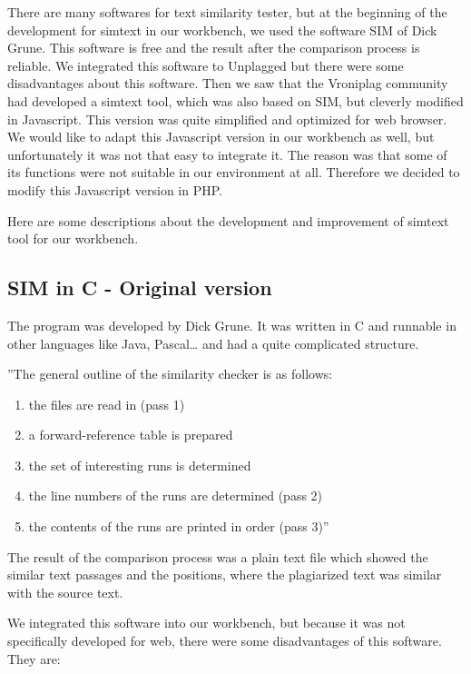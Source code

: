 There are many softwares for text similarity tester, but at the beginning of the development for simtext in our workbench, we used the software SIM of Dick Grune. This software is free and the result after the comparison process is reliable. We integrated this software to Unplagged but there were some disadvantages about this software. Then we saw that the Vroniplag community had developed a simtext tool, which was also based on SIM, but cleverly modified in Javascript. This version was quite simplified and optimized for web browser. We would like to adapt this Javascript version in our workbench as well, but unfortunately it was not that easy to integrate it. The reason was that some of its functions were not suitable in our environment at all. Therefore we decided to modify this Javascript version in PHP. 

Here are some descriptions about the development and improvement of simtext tool for our workbench.

\subsection{SIM in C - Original version}
The program was developed by Dick Grune. It was written in C and runnable in other languages like Java, Pascal… and had a quite complicated structure. 

''The general outline of the similarity checker is as follows:


\begin{enumerate}
\item the files are read in (pass 1)
\item a forward-reference table is prepared
\item the set of interesting runs is determined
\item the line numbers of the runs are determined (pass 2)
\item the contents of the runs are printed in order (pass 3)''
\end{enumerate}

The result of the comparison process was a plain text file which showed the similar text passages and the positions, where the plagiarized text was similar with the source text.

We integrated this software into our workbench, but because it was not specifically developed for web, there were some disadvantages of this software. They are:


